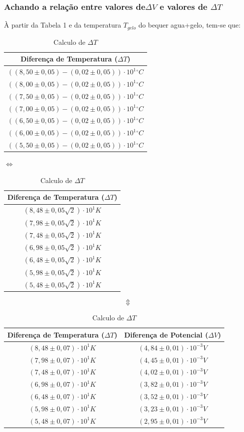 \documentclass[a4paper]{article}
\providecommand{\tabularnewline}{\\}
\providecommand{\tabularnewline}{\\} %
\begin{document}
		\subsubsection{Achando a relação entre valores de$\Delta V$ e valores de $\Delta T$}
		À partir da Tabela 1 e da temperatura $T_{gelo}$ do bequer agua+gelo, tem-se que:

\begin{table}[!ht]
	\caption{Calculo de $\Delta T$}
	\begin{centering}\begin{tabular}{|c|}
		\hline 
		Diferença de Temperatura ($\Delta T$) \tabularnewline
		\hline 
		$\left((8,50\pm0,05)-(0,02\pm0,05)\right)\cdot10^{1}\unit{^{\circ}C}$\tabularnewline
		\hline 
		$\left((8,00\pm0,05)-(0,02\pm0,05)\right)\cdot10^{1}\unit{^{\circ}C}$\tabularnewline
		\hline 
		$\left((7,50\pm0,05)-(0,02\pm0,05)\right)\cdot10^{1}\unit{^{\circ}C}$\tabularnewline
		\hline 
		$\left((7,00\pm0,05)-(0,02\pm0,05)\right)\cdot10^{1}\unit{^{\circ}C}$\tabularnewline
		\hline 
		$\left((6,50\pm0,05)-(0,02\pm0,05)\right)\cdot10^{1}\unit{^{\circ}C}$\tabularnewline
		\hline 
		$\left((6,00\pm0,05)-(0,02\pm0,05)\right)\cdot10^{1}\unit{^{\circ}C}$\tabularnewline
		\hline 
		$\left((5,50\pm0,05)-(0,02\pm0,05)\right)\cdot10^{1}\unit{^{\circ}C}$\tabularnewline
		\hline 
	\end{tabular}
				$\Longleftrightarrow$
	\begin{tabular}{|c|}
		\hline 
		Diferença de Temperatura ($\Delta T$) \tabularnewline
		\hline 
		$(8,48\pm0,05\sqrt{2})\cdot10^{1}\unit{K}$\tabularnewline
		\hline 
		$(7,98\pm0,05\sqrt{2})\cdot10^{1}\unit{K}$\tabularnewline
		\hline 
		$(7,48\pm0,05\sqrt{2})\cdot10^{1}\unit{K}$\tabularnewline
		\hline 
		$(6,98\pm0,05\sqrt{2})\cdot10^{1}\unit{K}$\tabularnewline
		\hline 
		$(6,48\pm0,05\sqrt{2})\cdot10^{1}\unit{K}$\tabularnewline
		\hline 
		$(5,98\pm0,05\sqrt{2})\cdot10^{1}\unit{K}$\tabularnewline
		\hline 
		$(5,48\pm0,05\sqrt{2})\cdot10^{1}\unit{K}$\tabularnewline
		\hline 
	\end{tabular}\par\end{centering}
				\[
				\Updownarrow
				\]
	\centering{}\begin{tabular}{|c|c|}
		\hline 
		Diferença de Temperatura ($\Delta T$)  & Diferença de Potencial ($\Delta V$)\tabularnewline
		\hline 
		$(8,48\pm0,07)\cdot10^{1}\unit{K}$  & $(4,84\pm0,01)\cdot10^{-3}\unit{V}$\tabularnewline
		\hline 
		$(7,98\pm0,07)\cdot10^{1}\unit{K}$  & $(4,45\pm0,01)\cdot10^{-3}\unit{V}$\tabularnewline
		\hline 
		$(7,48\pm0,07)\cdot10^{1}\unit{K}$  & $(4,02\pm0,01)\cdot10^{-3}\unit{V}$\tabularnewline
		\hline 
		$(6,98\pm0,07)\cdot10^{1}\unit{K}$  & $(3,82\pm0,01)\cdot10^{-3}\unit{V}$\tabularnewline
		\hline 
		$(6,48\pm0,07)\cdot10^{1}\unit{K}$  & $(3,52\pm0,01)\cdot10^{-3}\unit{V}$\tabularnewline
		\hline 
		$(5,98\pm0,07)\cdot10^{1}\unit{K}$  & $(3,23\pm0,01)\cdot10^{-3}\unit{V}$\tabularnewline
		\hline 
		$(5,48\pm0,07)\cdot10^{1}\unit{K}$  & $(2,95\pm0,01)\cdot10^{-3}\unit{V}$\tabularnewline
		\hline 
	\end{tabular}
\end{table}
\end{document}
